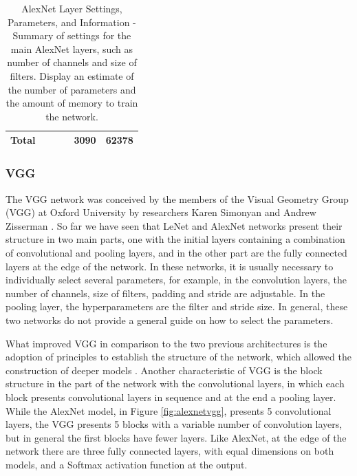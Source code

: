 \begin{center}
\begin{table}[]
\begin{tabular}{|l|c|c|c|c|c|}
Total             &                                                                &                                                               &                                                               & 3090                                                           & 62378               \\ \hline
\end{tabular}
\caption{AlexNet Layer Settings, Parameters, and Information - Summary of settings for the main AlexNet layers, such as number of channels and size of filters. Display an estimate of the number of parameters and the amount of memory to train the network.}

\label{table:tablealexnet}
\end{table}
\end{center}

\subsubsection{VGG} \label{vgg}

The VGG network was conceived by the members of the Visual Geometry Group (VGG) at Oxford University by researchers Karen Simonyan and Andrew Zisserman \cite{zhang2020dive}. So far we have seen that LeNet and AlexNet networks present their structure in two main parts, one with the initial layers containing a combination of convolutional and pooling layers, and in the other part are the fully connected layers at the edge of the network. In these networks, it is usually necessary to individually select several parameters, for example, in the convolution layers, the number of channels, size of filters, padding and stride are adjustable. In the pooling layer, the hyperparameters are the filter and stride size. In general, these two networks do not provide a general guide on how to select the parameters.

What improved VGG in comparison to the two previous architectures is the adoption of principles to establish the structure of the network, which allowed the construction of deeper models \cite{zhang2020dive}. Another characteristic of VGG is the block structure in the part of the network with the convolutional layers, in which each block presents convolutional layers in sequence and at the end a pooling layer. While the AlexNet model, in Figure \ref{fig:alexnetvgg}, presents 5 convolutional layers, the VGG presents 5 blocks with a variable number of convolution layers, but in general the first blocks have fewer layers. Like AlexNet, at the edge of the network there are three fully connected layers, with equal dimensions on both models, and a Softmax activation function at the output.

